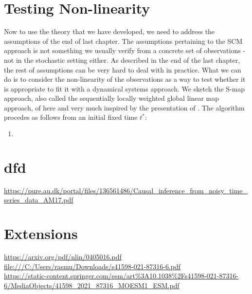 \documentclass[11pt, a4paper]{memoir}
\theoremstyle{break}
\theoremstyle{break}
\theoremstyle{nonumberplain}
\begin{document}
\section{Testing Non-linearity}

Now to use the theory that we have developed, we need to address the assumptions of the end of last chapter. The assumptions pertaining to the SCM approach is not something we usually verify from a concrete set of observations - not in the stochastic setting either. As described in the end of the last chapter, the rest of assumptions can be very hard to deal with in practice. What we can do is to consider the non-linearity of the observations as a way to test whether it is appropriate to fit it with a dynamical systems approach.
We sketch the S-map approach, also called the sequentially locally weighted global linear map approach, of \cite{SMap} here and very much inspired by the presentation of \cite{EDM}. The algorithm procedes as follows from an initial fixed time $t^*$:
\begin{enumerate}[label=(\roman*)]
	\item 
\end{enumerate}




\section{dfd}
\url{https://pure.au.dk/portal/files/136561486/Causal_inference_from_noisy_time_series_data_AM17.pdf}



\section{Extensions}
\url{https://arxiv.org/pdf/nlin/0405016.pdf}\\[5pt]
\url{file:///C:/Users/rasmu/Downloads/s41598-021-87316-6.pdf}\\[5pt]
\url{https://static-content.springer.com/esm/art%3A10.1038%2Fs41598-021-87316-6/MediaObjects/41598_2021_87316_MOESM1_ESM.pdf}
\end{document}
